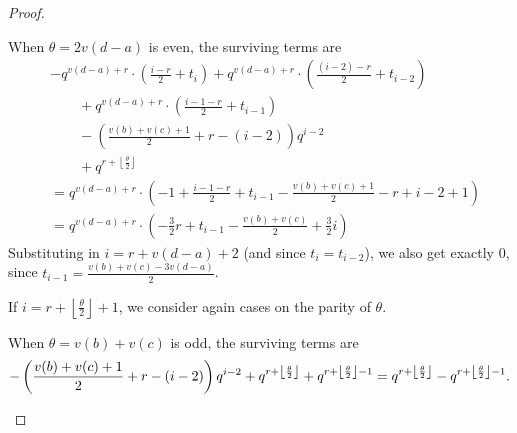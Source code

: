 \begin{proof}
\begin{itemize}
\begin{itemize}
      \ii When $\theta = 2v(d-a)$ is even, the surviving terms are
      \begin{align*}
        &-q^{v(d-a)+r} \cdot \left( \frac{i-r}{2} + t_{i} \right)
          + q^{v(d-a)+r} \cdot \left( \frac{(i-2)-r}{2} + t_{i-2} \right) \\
        &\qquad+ q^{v(d-a)+r} \cdot \left( \frac{i-1-r}{2} + t_{i-1} \right) \\
        &\qquad- \left( \frac{v(b)+v(c)+1}{2} + r - (i-2) \right) q^{i-2} \\
        &\qquad+ q^{r + \left\lfloor \frac{\theta}{2} \right\rfloor} \\
        &= q^{v(d-a)+r} \cdot \left( -1 + \frac{i-1-r}{2} + t_{i-1} - \frac{v(b)+v(c)+1}{2} - r  + i - 2 +1 \right) \\
        &= q^{v(d-a)+r} \cdot \left( -\frac{3}{2}r + t_{i-1} - \frac{v(b)+v(c)}{2} + \frac32 i \right)
      \end{align*}
      Substituting in $i = r + v(d-a) + 2$ (and since $t_i = t_{i-2}$),
      we also get exactly $0$,
      since $t_{i-1} = \frac{v(b)+v(c)-3v(d-a)}{2}$.
    \end{itemize}

    \ii If $i = r + \left\lfloor \frac{\theta}{2} \right\rfloor + 1$,
    we consider again cases on the parity of $\theta$.
    \begin{itemize}
      \ii When $\theta = v(b)+v(c)$ is odd, the surviving terms are
      \[
        -\left( \frac{v(b)+v(c)+1}{2} + r - (i-2) \right) q^{i-2} \\
        + q^{r+\left\lfloor \frac{\theta}{2} \right\rfloor} + q^{r+\left\lfloor \frac{\theta}{2} \right\rfloor-1} \\
        = q^{r+\left\lfloor \frac{\theta}{2} \right\rfloor} - q^{r+\left\lfloor \frac{\theta}{2} \right\rfloor - 1}.
      \]


\end{itemize}
\end{itemize}
\end{proof}
